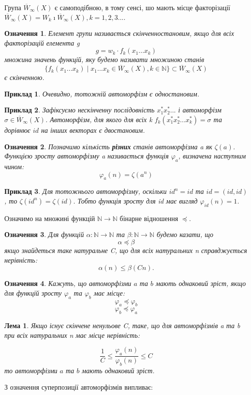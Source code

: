 \documentclass[a4paper,12pt]{article} \usepackage{a4wide}
\numberwithin{equation}{subsection}
\newtheorem{lemma}{Лема}[subsection]
\newtheorem{definition}{Означення}[subsection]
\newtheorem{example}{Приклад}[subsection]
\begin{document}
   Група $ \overline{W}_\infty (X)$
   є самоподібною, в тому сенсі, шо мають місце факторізації $\overline{W}_\infty (X)=W_k\imath \overline{W}_\infty (X), k=1,2,3...$.
 \begin{definition} Елемент групи називається скінченностановим, якщо для всіх факторізацій елемента g
  $$g=w_k\cdot f_k(x_1...x_k)$$
  множина значень функцій, яку будемо називати множиною станів
  $$\{f_k(x_1...x_k)\mid x_1...x_k \in \overline{W}_\infty (X), k\in \mathbb{N}\}\subset \overline{W}_\infty (X)$$
  є скінченною.
    \end{definition}

 \begin{example}
 Очевидно, тотожній автоморфізм є одностановим.
\end{example}

\begin{example}
Зафіксуємо нескінченну послідовність $x_1^* x_2^* ... $  і автоморфізм $\sigma \in \overline{W}_\infty (X) $.
 Автоморфізм, для якого для всіх k $f_k(x_1^* x_2^* ...x_k^*)=\sigma$  та   дорівнює $id$ на інших векторах є двостановим.
\end{example}
 \begin{definition}
 Позначимо кількість \textbf{різних} станів автоморфізма a як $\zeta(a)$. Функцією зросту автоморфізму a називається функція $\varphi_a$, визначена наступним чином:
 $$\varphi_a(n)=\zeta(a^n)$$
 \end{definition}
  \begin{example}
  Для тотожнього автоморфізму, оскільки $id^n=id$ та $id=(id,id)$, то $\zeta(id^n)=\zeta(id)$. Тобто функція зросту для id має вигляд $\varphi_{id}(n)=1$.

   \end{example}
Означимо на множині функцій $\mathbb{N}\rightarrow \mathbb{N}$ бінарне відношення $\preccurlyeq$.
\begin{definition}\cite{Gr1}
Для функцій $\alpha:\mathbb{N}\rightarrow\mathbb{N}$ та $\beta:\mathbb{N}\rightarrow\mathbb{N}$ будемо казати,
що $$\alpha\preccurlyeq\beta$$ якщо знайдеться таке натуральне C, що для всіх натуральних n справджується
нерівність:
$$\alpha(n)\leqslant\beta(Cn).$$
 \end{definition}
 \begin{definition}

 Кажуть, що автоморфізми $a$ та $b$ мають однаковий зріст, якщо для функцій зросту $\varphi_a$ та $\varphi_b$ має місце:
 $$\varphi_a\preccurlyeq\varphi_b$$
$$\varphi_b\preccurlyeq\varphi_a$$




\end{definition}
\begin{lemma}

 Якщо існує скінчене ненульове C, таке, що для автоморфізмів a та b при всіх натуральних n має місце нерівність:


\[
\frac{1}{C} \le \frac{{\varphi _a (n)}}{{\varphi _b (n)}} \le C
\]
то автоморфізми $a$ та $b$ мають однаковий зріст.
\end{lemma}
З означення суперпозиції автоморфізмів випливає:
\end{document}

